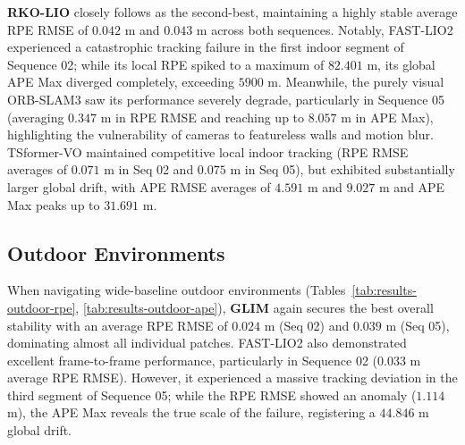 \documentclass[pdflatex,sn-mathphys-num]{sn-jnl}
\theoremstyle{thmstyleone}%
\theoremstyle{thmstyletwo}%
\theoremstyle{thmstylethree}%
\begin{document}
\textbf{RKO-LIO} closely follows as the second-best, maintaining a highly stable average RPE RMSE of $0.042$ m and $0.043$ m across both sequences. Notably, FAST-LIO2 experienced a catastrophic tracking failure in the first indoor segment of Sequence 02; while its local RPE spiked to a maximum of $82.401$ m, its global APE Max diverged completely, exceeding $5900$ m. Meanwhile, the purely visual ORB-SLAM3 saw its performance severely degrade, particularly in Sequence 05 (averaging $0.347$ m in RPE RMSE and reaching up to $8.057$ m in APE Max), highlighting the vulnerability of cameras to featureless walls and motion blur. TSformer-VO maintained competitive local indoor tracking (RPE RMSE averages of $0.071$ m in Seq 02 and $0.075$ m in Seq 05), but exhibited substantially larger global drift, with APE RMSE averages of $4.591$ m and $9.027$ m and APE Max peaks up to $31.691$ m.



\subsection{Outdoor Environments}


When navigating wide-baseline outdoor environments (Tables~\ref{tab:results-outdoor-rpe}, \ref{tab:results-outdoor-ape}), \textbf{GLIM} again secures the best overall stability with an average RPE RMSE of $0.024$ m (Seq 02) and $0.039$ m (Seq 05), dominating almost all individual patches. FAST-LIO2 also demonstrated excellent frame-to-frame performance, particularly in Sequence 02 ($0.033$ m average RPE RMSE). However, it experienced a massive tracking deviation in the third segment of Sequence 05; while the RPE RMSE showed an anomaly ($1.114$ m), the APE Max reveals the true scale of the failure, registering a $44.846$ m global drift. 

\end{document}
